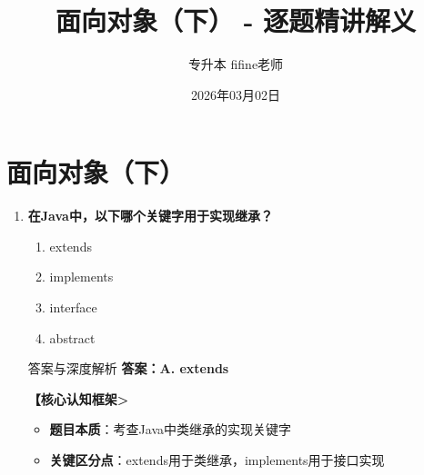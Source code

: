 \documentclass[12pt, a4paper]{ctexart}
\title{\textcolor{myblue}{\textbf{面向对象（下） - 逐题精讲解义}}}
\author{专升本 fifine老师}
\date{2026年03月02日}
\begin{document}
\maketitle
\thispagestyle{empty}
\newpage

\section{面向对象（下）}

\begin{enumerate}[label=\textbf{\arabic*.}]

	\item \textbf{在Java中，以下哪个关键字用于实现继承？}
	      \begin{enumerate}[label=\Alph*.]
		      \item extends
		      \item implements
		      \item interface
		      \item abstract
	      \end{enumerate}

	      \begin{bluebox}{答案与深度解析}
		      \textbf{答案：A. extends}

		      \textbf{【核心认知框架>}
		      \begin{itemize}[leftmargin=*, nosep, label={}]
			      \item \textbf{题目本质}：考查Java中类继承的实现关键字
			      \item \textbf{关键区分点}：extends用于类继承，implements用于接口实现
		      \end{itemize}


\end{bluebox}
\end{enumerate}
\end{document}

